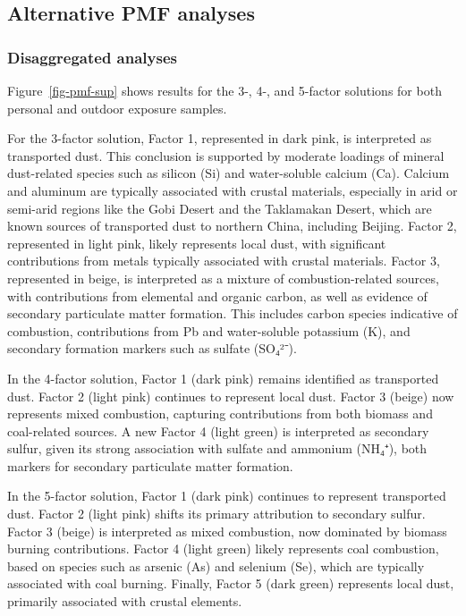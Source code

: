 \documentclass[
  letterpaper,
  DIV=11,
  numbers=noendperiod]{scrartcl}
\begin{document}
\newpage

\subsection{Alternative PMF analyses}\label{alternative-pmf-analyses}

\subsubsection{Disaggregated analyses}\label{disaggregated-analyses}

Figure~\ref{fig-pmf-sup} shows results for the 3-, 4-, and 5-factor
solutions for both personal and outdoor exposure samples.

For the 3-factor solution, Factor 1, represented in dark pink, is
interpreted as transported dust. This conclusion is supported by
moderate loadings of mineral dust-related species such as silicon (Si)
and water-soluble calcium (Ca). Calcium and aluminum are typically
associated with crustal materials, especially in arid or semi-arid
regions like the Gobi Desert and the Taklamakan Desert, which are known
sources of transported dust to northern China, including Beijing. Factor
2, represented in light pink, likely represents local dust, with
significant contributions from metals typically associated with crustal
materials. Factor 3, represented in beige, is interpreted as a mixture
of combustion-related sources, with contributions from elemental and
organic carbon, as well as evidence of secondary particulate matter
formation. This includes carbon species indicative of combustion,
contributions from Pb and water-soluble potassium (K), and secondary
formation markers such as sulfate (SO₄²⁻).

In the 4-factor solution, Factor 1 (dark pink) remains identified as
transported dust. Factor 2 (light pink) continues to represent local
dust. Factor 3 (beige) now represents mixed combustion, capturing
contributions from both biomass and coal-related sources. A new Factor 4
(light green) is interpreted as secondary sulfur, given its strong
association with sulfate and ammonium (NH₄⁺), both markers for secondary
particulate matter formation.

In the 5-factor solution, Factor 1 (dark pink) continues to represent
transported dust. Factor 2 (light pink) shifts its primary attribution
to secondary sulfur. Factor 3 (beige) is interpreted as mixed
combustion, now dominated by biomass burning contributions. Factor 4
(light green) likely represents coal combustion, based on species such
as arsenic (As) and selenium (Se), which are typically associated with
coal burning. Finally, Factor 5 (dark green) represents local dust,
primarily associated with crustal elements.
\end{document}
